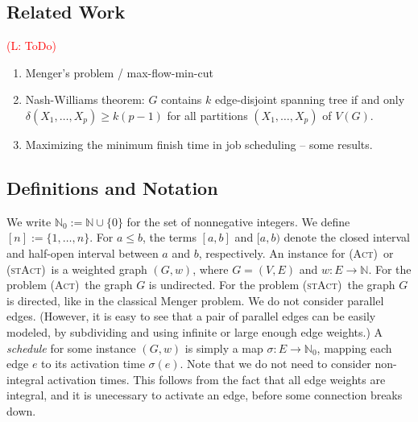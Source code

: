 \documentclass[runningheads]{llncs}
\numberwithin{equation}{section}
\newcommand{\N}{\mathbb{N}}
\newcommand{\set}[1]{\{ #1 \}}
\newcommand{\fromto}[2]{\set{#1, \ldots, #2}}
\newcommand{\comment}[1]{\textcolor{red}{(L: #1)}}
\newcommand{\act}{\textsc{(Act)}}
\newcommand{\stact}{\textsc{(stAct)}}
\begin{document}
\subsection{Related Work}
\comment{ToDo}
\begin{enumerate}
\item Menger's problem / max-flow-min-cut
\item Nash-Williams theorem: $G$ contains $k$ edge-disjoint spanning tree if and only $\delta(X_1, \dots, X_p) \geq k(p - 1)$ for all partitions $(X_1, \dots, X_p)$ of $V(G)$. 
\item Maximizing the minimum finish time in job scheduling -- some results.
\end{enumerate}

\subsection{Definitions and Notation}
\label{sec_notation}

We write $\N_0 := \N \cup \set{0}$ for the set of nonnegative integers. We define $[n] := \fromto{1}{n}$. For $a \leq b$, the terms $[a, b]$ and $[a, b)$ denote the closed interval and half-open interval between $a$ and $b$, respectively. An instance for \act\ or \stact\ is a weighted graph $(G, w)$, where $G = (V, E)$ and $w : E \rightarrow \N$. For the problem \act\ the graph $G$ is undirected. For the problem \stact\ the graph $G$ is directed, like in the classical Menger problem. We do not consider parallel edges. (However, it is easy to see that a pair of parallel edges can be easily modeled, by subdividing and using infinite or large enough edge weights.) A \emph{schedule} for some instance $(G, w)$ is simply a map $\sigma : E \rightarrow \N_0$, mapping each edge $e$ to its activation time $\sigma(e)$. Note that we do not need to consider non-integral activation times. This follows from the fact that all edge weights are integral, and it is unecessary to activate an edge, before some connection breaks down.
\end{document}
